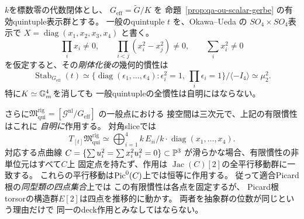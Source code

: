 \begin{proposition}[一般quintupleの有限慣性と三次元の接slice]
\label{prop:qa-ou-generic-quintuple-finite-inertia}
$k$を標数零の代数閉体とし、
$G_{\mathrm{eff}}=\widetilde G/K$ を
命題~\ref{prop:qa-ou-scalar-gerbe} の有効quintuple表示群とする。
一般のquintuple $t$ を、Okawa--Ueda
\cite[\S3, (3.9)--(3.16)]{OU2014} の
$SO_4\times SO_4$表示で
$X=\operatorname{diag}(x_1,x_2,x_3,x_4)$ と書く。
\[
 \prod_i x_i\ne0,\qquad
 \prod_{i<j}(x_i^2-x_j^2)\ne0,\qquad
 \sum_i x_i^2\ne0
 \tag{OU-gen}\label{eq:qa-ou-stabilizer-generic-open}
\]
を仮定すると、その\emph{剛体化後の}幾何的慣性は
\[
 \operatorname{Stab}_{G_{\mathrm{eff}}}(t)
 \simeq
 \{\operatorname{diag}(\epsilon_1,\ldots,\epsilon_4):
       \epsilon_i^2=1,\ \prod_i\epsilon_i=1\}
       /\langle -I_4\rangle
 \simeq\mu_2^2 .
 \tag{OU-inertia}\label{eq:qa-ou-generic-finite-inertia}
\]
特に$K\simeq\mathbb G_m^4$を消しても
一般quintupleの全慣性は自明にはならない。

さらに$\mathfrak M_{\mathrm{qui}}^{\mathrm{rig}}
=[\mathscr G^{\mathrm{nl}}/G_{\mathrm{eff}}]$
の一般点における
接空間は三次元で、上記の有限慣性はこれに
\emph{自明に}作用する。
対角sliceでは
\[
 T_{[t]}\mathfrak M_{\mathrm{qui}}^{\mathrm{rig}}
 \simeq
 \bigoplus_{i=1}^4 k\,E_{ii}\big/
          k\cdot\operatorname{diag}(x_1,\ldots,x_4).
 \tag{OU-tangent}\label{eq:qa-ou-generic-rigid-tangent}
\]
対応する点曲線
$C=\{\sum u_i^2=\sum x_i^2u_i^2=0\}\subset\mathbb P^3$
が滑らかな場合、有限慣性の非単位元はすべて$C$上
固定点を持たず、作用は
$\operatorname{Jac}(C)[2]$の全平行移動群に一致する。
これらの平行移動は$\operatorname{Pic}^0(C)$上では恒等に作用する。
従って適合Picard根の\emph{同型類の四点集合}上では
この有限慣性は各点を固定するが、
Picard根torsorの構造群$E[2]$は四点を推移的に動かす。
両者を抽象群の位数が同じという理由だけで
同一のdeck作用とみなしてはならない。
\end{proposition}
